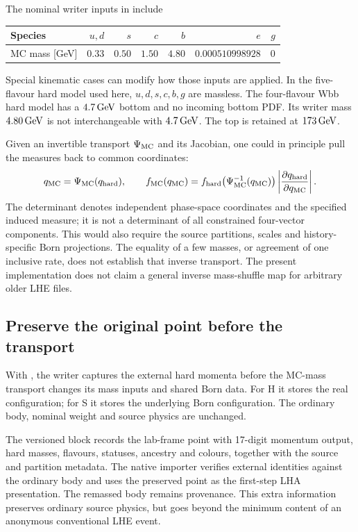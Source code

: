 The nominal writer inputs in
include
\begin{center}
\begin{tabular}{lrrrrrr}
\toprule
Species & $u,d$ & $s$ & $c$ & $b$ & $e$ & $g$\\
\midrule
MC mass [GeV] &
 $0.33$ & $0.50$ & $1.50$ & $4.80$ &
 $0.000510998928$ & $0$\\
\bottomrule
\end{tabular}
\end{center}
Special kinematic cases can modify how those inputs are applied.
In the five-flavour hard model used here,
$u,d,s,c,b,g$ are massless.
The four-flavour Wbb hard model has a $4.7\,\mathrm{GeV}$ bottom and no
incoming bottom PDF.
Its writer mass $4.80\,\mathrm{GeV}$ is not interchangeable with $4.7\,\mathrm{GeV}$.
The top is retained at $173\,\mathrm{GeV}$.

Given an invertible transport $\Psi_{\rm MC}$ and its Jacobian,
one could in principle pull the measures back to common coordinates:
\begin{equation}
 q_{\rm MC}=\Psi_{\rm MC}(q_{\rm hard}),\qquad
 f_{\rm MC}(q_{\rm MC})=
 f_{\rm hard}\!\left(\Psi_{\rm MC}^{-1}(q_{\rm MC})\right)
 \left|\frac{\partial q_{\rm hard}}{\partial q_{\rm MC}}\right|.
 \label{eq:masses-pullback}
\end{equation}
The determinant denotes independent phase-space coordinates and
the specified induced measure; it is not a determinant of all
constrained four-vector components.
This would also require the source partitions, scales and
history-specific Born projections.
The equality of a few masses, or agreement of one inclusive rate,
does not establish that inverse transport.
The present implementation does not claim a general inverse
mass-shuffle map for arbitrary older LHE files.

\subsection{Preserve the original point before the transport}
\label{sec:masses-annotation}

With , the writer captures the
external hard momenta before the MC-mass transport changes its
mass inputs and shared Born data.
For H it stores the real configuration; for S it stores the
underlying Born configuration.
The ordinary body, nominal weight and source physics are unchanged.

The versioned  block records
the lab-frame point with 17-digit momentum output, hard masses,
flavours, statuses, ancestry and colours, together with the
source and partition metadata.
The native importer verifies external identities against the ordinary
body and uses the preserved point as the first-step LHA presentation.
The remassed body remains provenance.
This extra information preserves ordinary source physics, but goes
beyond the minimum content of an anonymous conventional LHE event.

